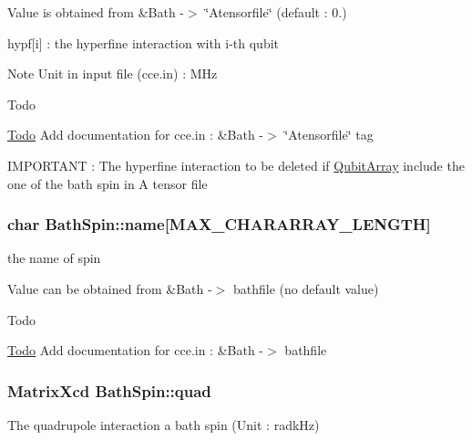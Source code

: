 Value is obtained from \&Bath -\/$>$ \char`\"{}\-Atensorfile\char`\"{} (default \-: 0.)
\begin{DoxyItemize}
\item hypf\mbox{[}i\mbox{]} \-: the hyperfine interaction with i-\/th qubit \begin{DoxyNote}{Note}
Unit in input file (cce.\-in) \-: M\-Hz 
\end{DoxyNote}
\begin{DoxyRefDesc}{Todo}
\item[\hyperlink{todo__todo000008}{Todo}]Add documentation for cce.\-in \-: \&Bath -\/$>$ \char`\"{}\-Atensorfile\char`\"{} tag 

I\-M\-P\-O\-R\-T\-A\-N\-T \-: The hyperfine interaction to be deleted if \hyperlink{structQubitArray}{Qubit\-Array} include the one of the bath spin in A tensor file \end{DoxyRefDesc}

\end{DoxyItemize}\hypertarget{structBathSpin_a2158c37aefcd8093520106945f5f7463}{
\subsubsection[{name}]{\setlength{\rightskip}{0pt plus 5cm}char Bath\-Spin\-::name\mbox{[}M\-A\-X\-\_\-\-C\-H\-A\-R\-A\-R\-R\-A\-Y\-\_\-\-L\-E\-N\-G\-T\-H\mbox{]}}}\label{structBathSpin_a2158c37aefcd8093520106945f5f7463}


the name of spin 

Value can be obtained from \&Bath -\/$>$ bathfile (no default value) \begin{DoxyRefDesc}{Todo}
\item[\hyperlink{todo__todo000001}{Todo}]Add documentation for cce.\-in \-: \&Bath -\/$>$ bathfile \end{DoxyRefDesc}
\hypertarget{structBathSpin_a304f556a5ba51a1275171e40d212d0d2}{
\subsubsection[{quad}]{\setlength{\rightskip}{0pt plus 5cm}Matrix\-Xcd Bath\-Spin\-::quad}}\label{structBathSpin_a304f556a5ba51a1275171e40d212d0d2}


The quadrupole interaction a bath spin (Unit \-: radk\-Hz) 

